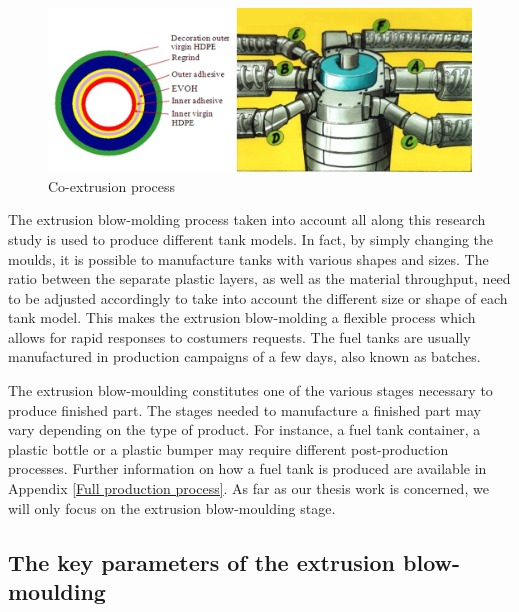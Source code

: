 \begin{figure}
\centerline{\includegraphics[scale=0.55]{images/chapter_1/coextrusion.png}}
\caption{Co-extrusion process}
\label{fig:Co-extrusion Process}
\end{figure}

The extrusion blow-molding process taken into account all along this research study is used to produce different tank models. In fact, by simply changing the moulds, it is possible to manufacture tanks with various shapes and sizes. The ratio between the separate plastic layers, as well as the material throughput, need to be adjusted accordingly to take into account the different size or shape of each tank model. This makes the extrusion blow-molding a flexible process which allows for rapid responses to costumers requests. The fuel tanks are usually manufactured in production campaigns of a few days, also known as batches.

The extrusion blow-moulding constitutes one of the various stages necessary to produce finished part. The stages needed to manufacture a finished part may vary depending on the type of product. For instance, a fuel tank container, a plastic bottle or a plastic bumper may require different post-production processes. Further information on how a fuel tank is produced are available in Appendix \ref{Full production process}. As far as our thesis work is concerned, we will only focus on the extrusion blow-moulding stage.

\subsection{The key parameters of the extrusion blow-moulding} \label{The key parameters of the Extrusion Blow-moulding}

